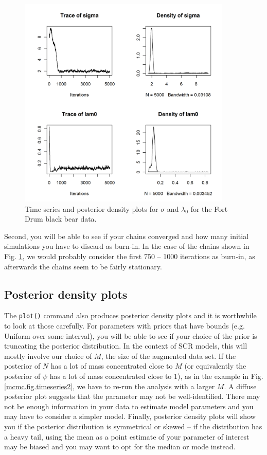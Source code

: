 \begin{figure}[ht]
\begin{center}
\includegraphics[height=4in]{Ch17-MCMC/figs/timeseries}
\end{center}
\caption{Time series and posterior density plots for $\sigma$ and $\lambda_0$ for the Fort Drum black bear data.}
\label{mcmc.fig.timeseries}
\end{figure}


Second, you will be able to see if your chains converged and how many initial simulations you have to discard as burn-in. In the case of the chains shown in Fig. \ref{mcmc.fig.timeseries}, we would probably consider the first 750 -- 1000 iterations as burn-in, as afterwards the chains seem to be fairly stationary.

\subsection{Posterior density plots}

The \verb#plot()# command also produces posterior density plots and it is worthwhile to look at those carefully. For parameters with priors that have bounds (e.g. Uniform over some interval), you will be able to see if your choice of the prior is truncating the posterior distribution. In the context of SCR models, this will mostly involve our choice of $M$, the size of the augmented data set. If the posterior of $N$ has a lot of mass concentrated close to $M$ (or equivalently the posterior of $\psi$ has a lot of mass concentrated close to 1), as in the example in Fig. \ref{mcmc.fig.timeseries2}, we have to re-run the analysis with a larger $M$.  A diffuse
posterior plot suggests
that the parameter may not be well-identified.
There may not be enough information in your data to estimate model parameters and you may have to consider a simpler model. Finally, posterior density plots will show you if the posterior distribution is symmetrical or skewed -- if the distribution has a heavy tail, using the mean as a point estimate of your parameter of interest may be biased and you may want to opt for the median or mode instead.

